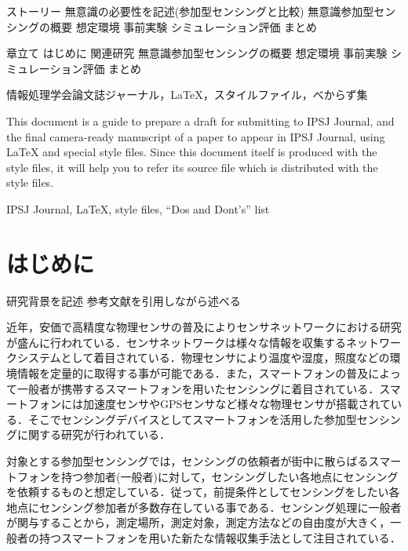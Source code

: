 \documentclass[submit,techrep]{ipsj}
\begin{document}
ストーリー
無意識の必要性を記述(参加型センシングと比較)
無意識参加型センシングの概要
	想定環境
事前実験
シミュレーション評価
まとめ

章立て
はじめに
関連研究
無意識参加型センシングの概要
	想定環境
事前実験
シミュレーション評価
まとめ



\begin{jkeyword}
情報処理学会論文誌ジャーナル，\LaTeX，スタイルファイル，べからず集
\end{jkeyword}

\begin{eabstract}
This document is a guide to prepare a draft for submitting to IPSJ
Journal, and the final camera-ready manuscript of a paper to appear in
IPSJ Journal, using {\LaTeX} and special style files.  Since this
document itself is produced with the style files, it will help you to
refer its source file which is distributed with the style files.
\end{eabstract}

\begin{ekeyword}
IPSJ Journal, \LaTeX, style files, ``Dos and Dont's'' list
\end{ekeyword}

\maketitle

\section{はじめに}

研究背景を記述
参考文献を引用しながら述べる

近年，安価で高精度な物理センサの普及によりセンサネットワークにおける研究が盛んに行われている．センサネットワークは様々な情報を収集するネットワークシステムとして着目されている\cite{Viani}．物理センサにより温度や湿度，照度などの環境情報を定量的に取得する事が可能である．また，スマートフォンの普及によって一般者が携帯するスマートフォンを用いたセンシングに着目されている．スマートフォンには加速度センサやGPSセンサなど様々な物理センサが搭載されている．そこでセンシングデバイスとしてスマートフォンを活用した参加型センシングに関する研究が行われている\cite{Nicholas}．

対象とする参加型センシングでは，センシングの依頼者が街中に散らばるスマートフォンを持つ参加者(一般者)に対して，センシングしたい各地点にセンシングを依頼するものと想定している\cite{Burke}．従って，前提条件としてセンシングをしたい各地点にセンシング参加者が多数存在している事である．センシング処理に一般者が関与することから，測定場所，測定対象，測定方法などの自由度が大きく，一般者の持つスマートフォンを用いた新たな情報収集手法として注目されている．
\end{document}
